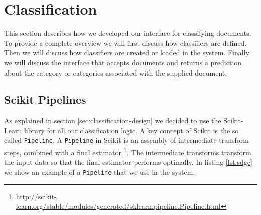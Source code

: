\section{Classification}\label{5-classification}
This section describes how we developed our interface for classifying documents. To provide a complete overview we will first discuss how classifiers are defined. Then we will discuss how classifiers are created or loaded in the system. Finally we will discuss the interface that accepts documents and returns a prediction about the category or categories associated with the supplied document.
\subsection{Scikit Pipelines}
As explained in section \ref{sec:classification-design} we decided to use the Scikit-Learn library for all our classification logic. A key concept of Scikit is the so called \texttt{Pipeline}. A \texttt{Pipeline} in Scikit is an assembly of intermediate transform steps, combined with a final estimator \footnote{\url{http://scikit-learn.org/stable/modules/generated/sklearn.pipeline.Pipeline.html}}. The intermediate transforms transform the input data so that the final estimator performs optimally. In listing \ref{lst:sdgc} we show an example of a \texttt{Pipeline} that we use in the system.\\

